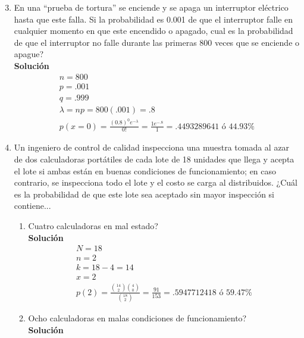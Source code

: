 \begin{enumerate}
	\setcounter{enumi}{2} %
	\item En una “prueba de tortura” se enciende y se apaga un interruptor eléctrico hasta que este falla. Si la probabilidad es 0.001 de que el interruptor falle en cualquier momento en que este encendido o apagado, cual es la probabilidad de que el interruptor no falle durante las primeras 800 veces que se enciende o apague?
    \\\textbf{Solución}
    \\
    \begin{gather*}
        n=800\\
        p=.001\\
        q=.999\\
        \lambda = np = 800(.001) = .8\\
        p(x=0) =  \frac{(0.8)^{0}{e}^{-\lambda}}{0!} = \frac{1{e}^{-.8}}{1} = .4493289641 \text{ ó } 44.93\%
    \end{gather*}
	\item Un ingeniero de control de calidad inspecciona una muestra tomada al azar de dos calculadoras portátiles de cada lote de 18 unidades que llega y acepta el lote si ambas están en buenas condiciones de funcionamiento; en caso contrario, se inspecciona todo el lote y el costo se carga al distribuidos. ¿Cuál es la probabilidad de que este lote sea aceptado sin mayor inspección si contiene...
	\begin{enumerate}
		\item Cuatro calculadoras en mal estado?
        \\\textbf{Solución}
        \\
        \begin{gather*}
            N=18\\
            n=2\\
            k=18-4=14\\
            x=2\\
            p(2) = \frac{\binom{14}{2}\binom{4}{0}}{\binom{18}{2}} = \frac{91}{153} = .5947712418 \text{ ó } 59.47\%
        \end{gather*}
		\item Ocho calculadoras en malas condiciones de funcionamiento?
        \\\textbf{Solución}
        \\

\end{enumerate}
\end{enumerate}
